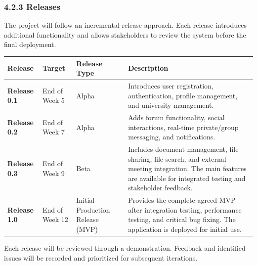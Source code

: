 \documentclass[12pt]{article}
\renewcommand{\baselinestretch}{1.5}
\begin{document}
\subsubsection*{4.2.3 Releases}
\par\medskip
The project will follow an incremental release approach. Each release introduces additional functionality and allows stakeholders to review the system before the final deployment.
\par\medskip
\begingroup
\scriptsize
\renewcommand{\baselinestretch}{1.0}\selectfont
\renewcommand{\arraystretch}{1.15}
\setlength{\tabcolsep}{4pt}
\begin{longtable}{|>{\raggedright\arraybackslash}p{}|>{\raggedright\arraybackslash}p{}|>{\raggedright\arraybackslash}p{}|>{\raggedright\arraybackslash}p{}|}
\hline
Release & Target & Release Type & Description \\ \hline
\endhead
\textbf{Release 0.1} & End of Week 5 & Alpha & Introduces user registration, authentication, profile management, and university management. \\ \hline
\textbf{Release 0.2} & End of Week 7 & Alpha & Adds forum functionality, social interactions, real-time private/\allowbreak{}group messaging, and notifications. \\ \hline
\textbf{Release 0.3} & End of Week 9 & Beta & Includes document management, file sharing, file search, and external meeting integration. The main features are available for integrated testing and stakeholder feedback. \\ \hline
\textbf{Release 1.0} & End of Week 12 & Initial Production Release (MVP) & Provides the complete agreed MVP after integration testing, performance testing, and critical bug fixing. The application is deployed for initial use. \\ \hline
\end{longtable}
\endgroup
\par\medskip
Each release will be reviewed through a demonstration. Feedback and identified issues will be recorded and prioritized for subsequent iterations.
\par\medskip
\hypertarget{sec:424-project-schedule}{}
\end{document}

